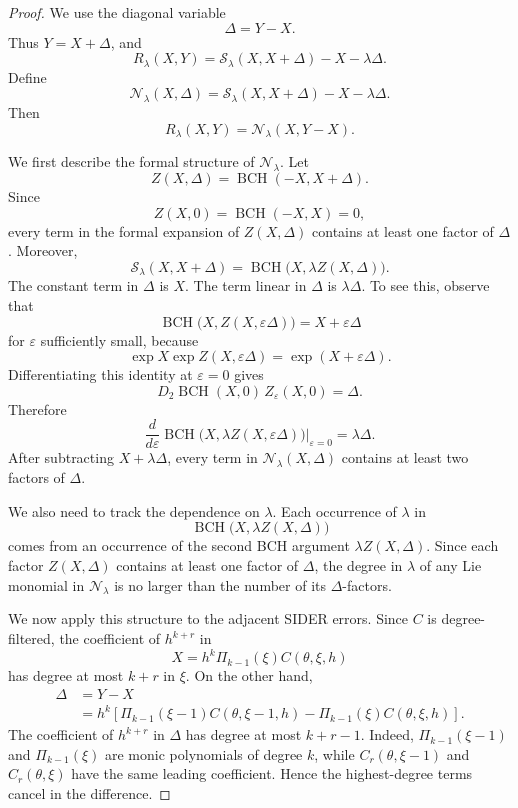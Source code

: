 \documentclass[a4paper,11pt]{article}
\newcommand{\BCH}{\operatorname{BCH}}
\numberwithin{equation}{section}
\theoremstyle{plain}
\theoremstyle{definition}
\theoremstyle{remark}
\begin{document}
\begin{proof}
We use the diagonal variable
\[
        \Delta=Y-X.
\]
Thus \(Y=X+\Delta\), and
\[
        R_\lambda(X,Y)
        =
        \mathcal S_\lambda(X,X+\Delta)-X-\lambda\Delta .
\]
Define
\[
        \mathcal N_\lambda(X,\Delta)
        =
        \mathcal S_\lambda(X,X+\Delta)-X-\lambda\Delta .
\]
Then
\[
        R_\lambda(X,Y)=\mathcal N_\lambda(X,Y-X).
\]

We first describe the formal structure of \(\mathcal N_\lambda\).  Let
\[
        Z(X,\Delta)=\BCH(-X,X+\Delta).
\]
Since
\[
        Z(X,0)=\BCH(-X,X)=0,
\]
every term in the formal expansion of \(Z(X,\Delta)\) contains at least one
factor of \(\Delta\).  Moreover,
\[
        \mathcal S_\lambda(X,X+\Delta)
        =
        \BCH\bigl(X,\lambda Z(X,\Delta)\bigr).
\]
The constant term in \(\Delta\) is \(X\).  The term linear in \(\Delta\) is
\(\lambda\Delta\).  To see this, observe that
\[
        \BCH\bigl(X,Z(X,\varepsilon\Delta)\bigr)
        =
        X+\varepsilon\Delta
\]
for \(\varepsilon\) sufficiently small, because
\[
        \exp X\exp Z(X,\varepsilon\Delta)
        =
        \exp(X+\varepsilon\Delta).
\]
Differentiating this identity at \(\varepsilon=0\) gives
\[
        D_2\BCH(X,0)\,Z_\varepsilon(X,0)=\Delta .
\]
Therefore
\[
        \frac{d}{d\varepsilon}
        \BCH\bigl(X,\lambda Z(X,\varepsilon\Delta)\bigr)
        \bigg|_{\varepsilon=0}
        =
        \lambda\Delta .
\]
After subtracting \(X+\lambda\Delta\), every term in
\(\mathcal N_\lambda(X,\Delta)\) contains at least two factors of
\(\Delta\).

We also need to track the dependence on \(\lambda\).  Each occurrence of
\(\lambda\) in
\[
        \BCH\bigl(X,\lambda Z(X,\Delta)\bigr)
\]
comes from an occurrence of the second BCH argument
\(\lambda Z(X,\Delta)\).  Since each factor \(Z(X,\Delta)\) contains at least
one factor of \(\Delta\), the degree in \(\lambda\) of any Lie monomial in
\(\mathcal N_\lambda\) is no larger than the number of its \(\Delta\)-factors.

We now apply this structure to the adjacent SIDER errors.  Since \(C\) is
degree-filtered, the coefficient of \(h^{k+r}\) in
\[
        X=h^k\Pi_{k-1}(\xi)C(\theta,\xi,h)
\]
has degree at most \(k+r\) in \(\xi\).  On the other hand,
\[
\begin{aligned}
        \Delta
        &=
        Y-X  \\
        &=
        h^k
        \left[
        \Pi_{k-1}(\xi-1)C(\theta,\xi-1,h)
        -
        \Pi_{k-1}(\xi)C(\theta,\xi,h)
        \right].
\end{aligned}
\]
The coefficient of \(h^{k+r}\) in \(\Delta\) has degree at most \(k+r-1\).
Indeed, \(\Pi_{k-1}(\xi-1)\) and \(\Pi_{k-1}(\xi)\) are monic polynomials of
degree \(k\), while \(C_r(\theta,\xi-1)\) and \(C_r(\theta,\xi)\) have the
same leading coefficient.  Hence the highest-degree terms cancel in the
difference.


\end{proof}
\end{document}
